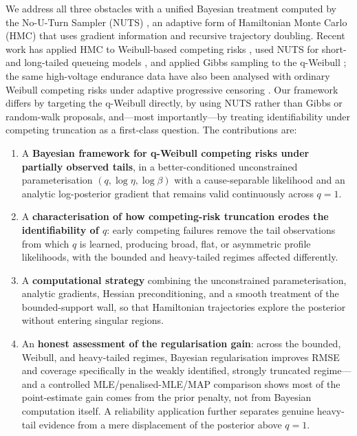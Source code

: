 \documentclass[ASNA,twocolumn]{USG}
\begin{document}
We address all three obstacles with a unified Bayesian treatment computed by
the No-U-Turn Sampler (NUTS) \cite{hoffman2014nuts}, an adaptive form of
Hamiltonian Monte Carlo (HMC) \cite{neal2011,betancourt2017} that uses
gradient information and recursive trajectory doubling. Recent work has
applied HMC to Weibull-based competing risks
\cite{abba2025wdcr,abdullahi2026,bfm2025}, used NUTS for short- and
long-tailed queueing models \cite{alawamy2025}, and applied Gibbs sampling to
the q-Weibull \cite{sigma2026gibbs}; the same high-voltage endurance data
have also been analysed with ordinary Weibull competing risks under adaptive
progressive censoring \cite{elshahhat2024}. Our framework differs by
targeting the q-Weibull directly, by using NUTS rather than Gibbs or
random-walk proposals, and---most importantly---by treating identifiability
under competing truncation as a first-class question. The contributions are:
\begin{enumerate}
  \item A \textbf{Bayesian framework for q-Weibull competing risks under
  partially observed tails}, in a better-conditioned unconstrained
  parameterisation $(q,\log\eta,\log\beta)$ with a cause-separable
  likelihood and an analytic log-posterior gradient that remains valid
  continuously across $q=1$.
  \item A \textbf{characterisation of how competing-risk truncation erodes
  the identifiability of $q$}: early competing failures remove the tail
  observations from which $q$ is learned, producing broad, flat, or
  asymmetric profile likelihoods, with the bounded and heavy-tailed
  regimes affected differently.
  \item A \textbf{computational strategy} combining the unconstrained
  parameterisation, analytic gradients, Hessian preconditioning, and a
  smooth treatment of the bounded-support wall, so that Hamiltonian
  trajectories explore the posterior without entering singular regions.
  \item An \textbf{honest assessment of the regularisation gain}: across the
  bounded, Weibull, and heavy-tailed regimes, Bayesian regularisation
  improves RMSE and coverage specifically in the weakly identified, strongly
  truncated regime---and a controlled MLE/penalised-MLE/MAP comparison
  shows most of the point-estimate gain comes from the prior penalty, not
  from Bayesian computation itself. A reliability application further
  separates genuine heavy-tail evidence from a mere displacement of the
  posterior above $q=1$.
\end{enumerate}
\end{document}
